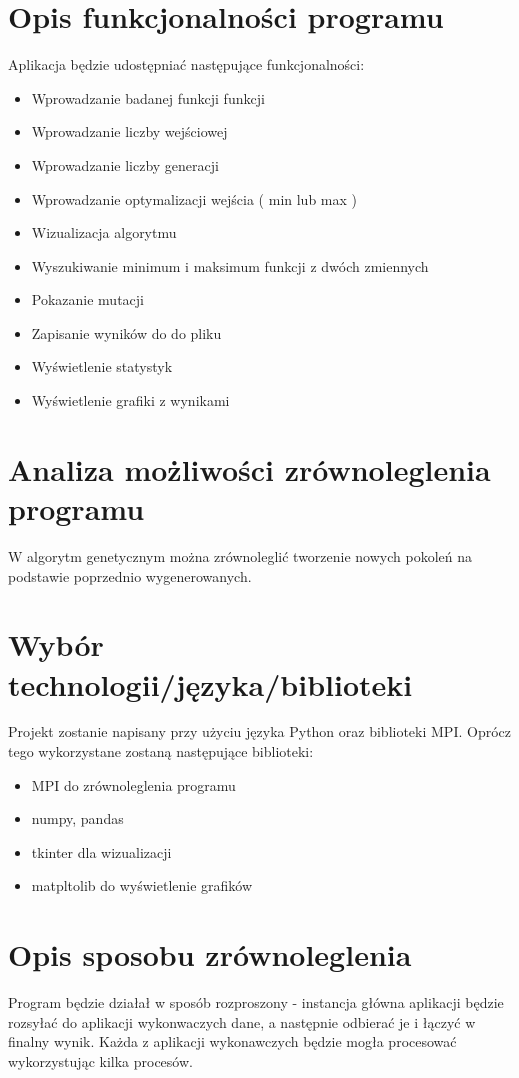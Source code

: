 \documentclass[a4paper, 12pt]{article}
\begin{document}
\section{Opis funkcjonalności programu}
Aplikacja będzie udostępniać następujące funkcjonalności:

\begin{itemize}
    \item Wprowadzanie badanej funkcji funkcji
    \item Wprowadzanie liczby wejściowej 
    \item Wprowadzanie liczby generacji
    \item Wprowadzanie optymalizacji wejścia ( min lub max )
    \item Wizualizacja algorytmu
    \item Wyszukiwanie minimum i maksimum funkcji z dwóch zmiennych
    \item Pokazanie mutacji
    \item Zapisanie wyników do do pliku
    \item Wyświetlenie  statystyk
    \item Wyświetlenie  grafiki z wynikami
\end{itemize}

\section{Analiza możliwości zrównoleglenia programu}
\hspace*{1cm} W algorytm genetycznym można zrównoleglić tworzenie nowych pokoleń na podstawie poprzednio wygenerowanych.
  
\section{Wybór technologii/języka/biblioteki}
	\hspace*{1cm} Projekt zostanie napisany przy użyciu języka Python oraz biblioteki MPI. 
Oprócz tego wykorzystane zostaną następujące biblioteki:
\begin{itemize}
    \item MPI do zrównoleglenia programu
    \item numpy, pandas
    \item tkinter dla wizualizacji
    \item matpltolib do wyświetlenie grafików
\end{itemize}
\section{Opis sposobu zrównoleglenia}
Program będzie działał w sposób rozproszony - instancja główna aplikacji będzie rozsyłać do aplikacji wykonwaczych dane, a następnie odbierać je i łączyć w finalny wynik. Każda z aplikacji wykonawczych będzie mogła procesować wykorzystując kilka procesów. 
\end{document}
